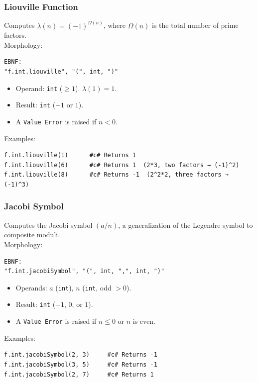 \subsubsection{Liouville Function}
Computes $\lambda(n) = (-1)^{\Omega(n)}$, where $\Omega(n)$ is the total number of prime factors. \\
Morphology:
\begin{verbatim}
EBNF:
"f.int.liouville", "(", int, ")"
\end{verbatim}
\begin{itemize}
\item Operand: \texttt{int} ($\geq 1$). $\lambda(1) = 1$.
\item Result: \texttt{int} ($-1$ or $1$).
\item A \texttt{Value Error} is raised if $n < 0$.
\end{itemize}
Examples:
\begin{verbatim}
f.int.liouville(1)      #c# Returns 1
f.int.liouville(6)      #c# Returns 1  (2*3, two factors → (-1)^2)
f.int.liouville(8)      #c# Returns -1  (2^2*2, three factors → (-1)^3)
\end{verbatim}

\subsubsection{Jacobi Symbol}
Computes the Jacobi symbol $(a/n)$, a generalization of the Legendre symbol to composite moduli. \\
Morphology:
\begin{verbatim}
EBNF:
"f.int.jacobiSymbol", "(", int, ",", int, ")"
\end{verbatim}
\begin{itemize}
\item Operands: $a$ (\texttt{int}), $n$ (\texttt{int}, odd $> 0$).
\item Result: \texttt{int} ($-1$, $0$, or $1$).
\item A \texttt{Value Error} is raised if $n \leq 0$ or $n$ is even.
\end{itemize}
Examples:
\begin{verbatim}
f.int.jacobiSymbol(2, 3)     #c# Returns -1
f.int.jacobiSymbol(3, 5)     #c# Returns -1
f.int.jacobiSymbol(2, 7)     #c# Returns 1
\end{verbatim}

